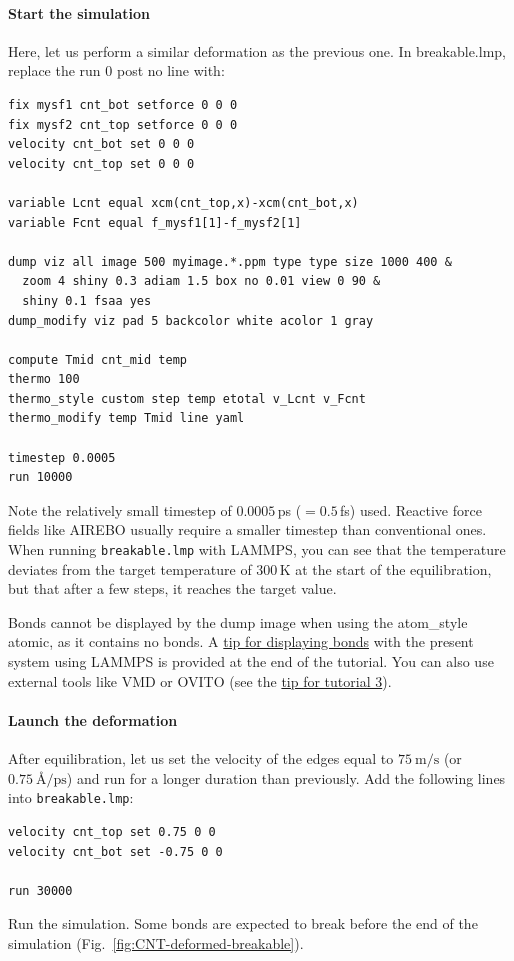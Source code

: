 \documentclass[9pt,tutorial]{livecoms}
\newcommand{\lmpcmd}[1]{\hspace{0pt}\colorbox{listing}{\textcolor{command}{\small{#1}}}\hspace{0pt}} %
\newcommand{\lmpcmdnote}[1]{\hspace{0pt}\colorbox{note_listing}{\textcolor{command}{\small{#1}}}\hspace{0pt}} %
\newcommand{\flecmd}[1]{\textcolor{command}{\texttt{#1}}} %
\begin{document}
\paragraph{Start the simulation}

Here, let us perform a similar deformation as the previous one.
In \lmpcmd{breakable.lmp}, replace the \lmpcmd{run 0 post no} line with:
\begin{lstlisting}
fix mysf1 cnt_bot setforce 0 0 0
fix mysf2 cnt_top setforce 0 0 0
velocity cnt_bot set 0 0 0
velocity cnt_top set 0 0 0

variable Lcnt equal xcm(cnt_top,x)-xcm(cnt_bot,x)
variable Fcnt equal f_mysf1[1]-f_mysf2[1]

dump viz all image 500 myimage.*.ppm type type size 1000 400 &
  zoom 4 shiny 0.3 adiam 1.5 box no 0.01 view 0 90 &
  shiny 0.1 fsaa yes
dump_modify viz pad 5 backcolor white acolor 1 gray

compute Tmid cnt_mid temp
thermo 100
thermo_style custom step temp etotal v_Lcnt v_Fcnt
thermo_modify temp Tmid line yaml

timestep 0.0005
run 10000
\end{lstlisting}
Note the relatively small timestep of $0.0005$\,ps ($= 0.5$\,fs) used.  Reactive force
fields like AIREBO usually require a smaller timestep than conventional ones.  When running
\flecmd{breakable.lmp} with LAMMPS, you can see that the temperature deviates
from the target temperature of $300\,\text{K}$ at the start of the equilibration,
but that after a few steps, it reaches the target value.

\begin{note}
  Bonds cannot be displayed by the \lmpcmdnote{dump image} when using
  the \lmpcmdnote{atom\_style atomic}, as it contains no bonds.  A
  \hyperref[tip-dynamic-bonds]{tip for displaying bonds} with the
  present system using LAMMPS is provided at the end of the tutorial.
  You can also use external tools like VMD or OVITO (see the
  \hyperref[tip-external-viz]{tip for tutorial 3}).
\end{note}

\paragraph{Launch the deformation}

After equilibration, let us set the velocity of the edges equal to
$75~\text{m/s}$ (or $0.75~\text{\AA{}/ps}$) and run for a longer duration than
previously.  Add the following lines into \flecmd{breakable.lmp}:
\begin{lstlisting}
velocity cnt_top set 0.75 0 0
velocity cnt_bot set -0.75 0 0

run 30000
\end{lstlisting}
Run the simulation.  Some bonds are expected to break before the end of the
simulation (Fig.~\ref{fig:CNT-deformed-breakable}).
\end{document}
